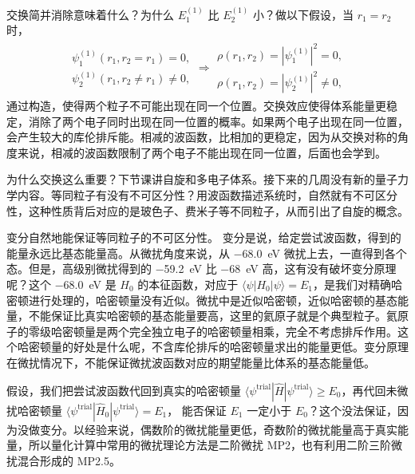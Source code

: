 交换简并消除意味着什么？为什么 $E^{(1)}_1$ 比 $E^{(1)}_2$ 小？做以下假设，当 $r_1 = r_2$ 时，
\begin{align}
    \begin{array}{l}
    \psi_1^{(1)} (r_1, r_2 = r_1) = 0, \\
    \psi_2^{(1)} (r_1, r_2 \neq r_1) \neq 0,
    \end{array}
    \Rightarrow
    \begin{array}{l}
    \rho(r_1, r_2) = |\psi_1^{(1)}|^2 = 0, \\
    \rho(r_1, r_2) = |\psi_2^{(1)}|^2 \neq 0,
    \end{array}
\end{align}
通过构造，使得两个粒子不可能出现在同一个位置。交换效应使得体系能量更稳定，消除了两个电子同时出现在同一位置的概率。如果两个电子出现在同一位置，会产生较大的库伦排斥能。相减的波函数，比相加的更稳定，因为从交换对称的角度来说，相减的波函数限制了两个电子不能出现在同一位置，后面也会学到。

为什么交换这么重要？下节课讲自旋和多电子体系。接下来的几周没有新的量子力学内容。等同粒子有没有不可区分性？用波函数描述系统时，自然就有不可区分性，这种性质背后对应的是玻色子、费米子等不同粒子，从而引出了自旋的概念。

变分自然地能保证等同粒子的不可区分性。
变分是说，给定尝试波函数，得到的能量永远比基态能量高。从微扰角度来说，从 \SI{-68.0}{\electronvolt} 微扰上去，一直得到各个态。但是，高级别微扰得到的 \SI{-59.2}{\electronvolt} 比 \SI{-68}{\electronvolt} 高，这有没有破坏变分原理呢？这个 \SI{-68.0}{\electronvolt} 是 $H_0$ 的本征函数，对应于 $\langle \psi | H_0 | \psi \rangle = E_1$，是我们对精确哈密顿进行处理的，哈密顿量没有近似。微扰中是近似哈密顿，近似哈密顿的基态能量，不能保证比真实哈密顿的基态能量要高，这里的氦原子就是个典型粒子。氦原子的零级哈密顿量是两个完全独立电子的哈密顿量相乘，完全不考虑排斥作用。这个哈密顿量的好处是什么呢，不含库伦排斥的哈密顿量求出的能量更低。变分原理在微扰情况下，不能保证微扰波函数对应的期望能量比体系的基态能量低。%

假设，我们把尝试波函数代回到真实的哈密顿量 $\langle \psi^{\text{trial}} | \hat H | \psi^{\text{trial}} \rangle \geqslant E_0$，再代回未微扰哈密顿量 $\langle \psi^{\text{trial}} | \hat H_0 | \psi^{\text{trial}} \rangle = E_1$，
能否保证 $E_1$ 一定小于 $E_0$？这个没法保证，因为没做变分。以经验来说，偶数阶的微扰能量更低，奇数阶的微扰能量高于真实能量，所以量化计算中常用的微扰理论方法是二阶微扰 MP2，也有利用二阶三阶微扰混合形成的 MP2.5。

